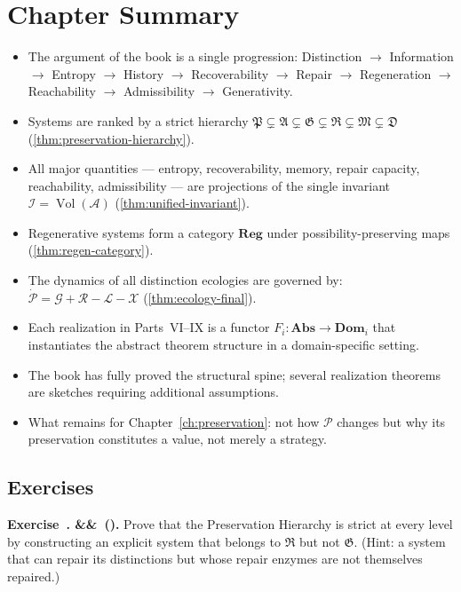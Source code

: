 \documentclass[12pt,twoside,openright]{book}
\newcommand{\adm}{\mathcal{A}}
\newcommand{\Vol}{\operatorname{Vol}}
\newenvironment{chapsummary}{%
  \begin{tcolorbox}[colback=DistBlue!5,colframe=DistBlue,
    title={\faBookOpen\enspace Summary},
    fonttitle=\sffamily\bfseries\color{white},
    attach boxed title to top left={yshift=-2mm,xshift=4mm},
    boxed title style={colback=DistBlue,rounded corners}]
  \begin{itemize}[nosep,leftmargin=*]}{%
  \end{itemize}\end{tcolorbox}}
\newcounter{exercise}[chapter]
\newenvironment{exercise}[1][]{%
  \refstepcounter{exercise}%
  \noindent\textbf{\sffamily\color{DistBlue}%
  Exercise~\thechapter.\theexercise%
  \ifx&#1&\else~(#1)\fi.}\enspace}{\par\medskip}
\begin{document}
\section*{Chapter Summary}
\begin{chapsummary}
  \item The argument of the book is a single progression:
        Distinction $\to$ Information $\to$ Entropy
        $\to$ History $\to$ Recoverability $\to$ Repair
        $\to$ Regeneration $\to$ Reachability
        $\to$ Admissibility $\to$ Generativity.
  \item Systems are ranked by a strict hierarchy
        $\mathfrak{P} \subsetneq \mathfrak{A}
        \subsetneq \mathfrak{G} \subsetneq \mathfrak{R}
        \subsetneq \mathfrak{M} \subsetneq \mathfrak{D}$
        (\cref{thm:preservation-hierarchy}).
  \item All major quantities — entropy, recoverability,
        memory, repair capacity, reachability, admissibility
        — are projections of the single invariant
        $\mathcal{I} = \Vol(\adm)$
        (\cref{thm:unified-invariant}).
  \item Regenerative systems form a category
        $\mathbf{Reg}$ under possibility-preserving maps
        (\cref{thm:regen-category}).
  \item The dynamics of all distinction ecologies are
        governed by:
        $\dot{\mathcal{P}} = \mathcal{G} + \mathcal{R}
        - \mathcal{L} - \mathcal{X}$
        (\cref{thm:ecology-final}).
  \item Each realization in Parts~VI--IX is a functor
        $F_i: \mathbf{Abs} \to \mathbf{Dom}_i$ that
        instantiates the abstract theorem structure
        in a domain-specific setting.
  \item The book has fully proved the structural spine;
        several realization theorems are sketches
        requiring additional assumptions.
  \item What remains for Chapter~\ref{ch:preservation}:
        not how $\mathcal{P}$ changes but why its
        preservation constitutes a value, not merely
        a strategy.
\end{chapsummary}

\subsection*{Exercises}

\begin{exercise}
  Prove that the Preservation Hierarchy is strict at
  every level by constructing an explicit system
  that belongs to $\mathfrak{R}$ but not $\mathfrak{G}$.
  (Hint: a system that can repair its distinctions but
  whose repair enzymes are not themselves repaired.)
\end{exercise}
\end{document}
